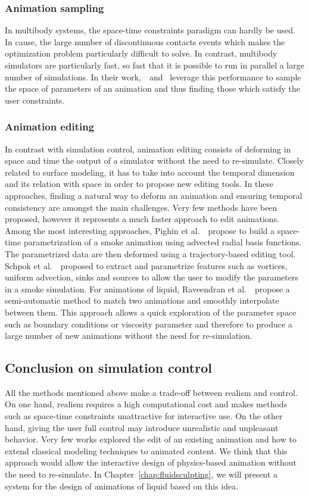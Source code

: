 \subsubsection{Animation sampling}
In multibody systems, the space-time constraints paradigm can hardly be used. In cause, the large number of discontinuous contacts events which makes the optimization problem particularly difficult to solve. In contrast, multibody simulators are particularly fast, so fast that it is possible to run in parallel a large number of simulations. In their work,~\cite{Chenney2000}~and~\cite{Twigg2007} leverage this performance to sample the space of parameters of an animation and thus finding those which satisfy the user constraints.

\subsubsection{Animation editing} 
In contrast with simulation control, animation editing consists of deforming in space and time the output of a simulator without the need to re-simulate.
Closely related to surface modeling, it has to take into account the temporal dimension and its relation with space in order to propose new editing tools. 
In these approaches, finding a natural way to deform an animation and ensuring temporal consistency are amongst the main challenges.
Very few methods have been proposed, however it represents a much faster approach to edit animations.
Among the most interesting approaches, Pighin et al.~\cite{Pighin2004}~propose to build a space-time parametrization of a smoke animation using advected radial basis functions. The parametrized data are then deformed using a trajectory-based editing tool.
Schpok et al.~\cite{Schpok2005}~proposed to extract and parametrize features such as vortices, uniform advection, sinks and sources to allow the user to modify the parameters in a smoke simulation.
For animations of liquid, Raveendran et al.~\cite{Raveendran2014}~propose a semi-automatic method to match two animations and smoothly interpolate between them. 
This approach allows a quick exploration of the parameter space such as boundary conditions or viscosity parameter and therefore to produce a large number of new animations without the need for re-simulation.

\subsection{Conclusion on simulation control}

All the methods mentioned above make a trade-off between realism and control.
On one hand, realism requires a high computational cost and makes methods such as space-time constraints unattractive for interactive use.
On the other hand, giving the user full control may introduce unrealistic and unpleasant behavior.
Very few works explored the edit of an existing animation and how to extend classical modeling techniques to animated content.
We think that this approach would allow the interactive design of physics-based animation without the need to re-simulate.
In Chapter~\ref{chap:fluidsculpting}, we will present a system for the design of animations of liquid based on this idea.
